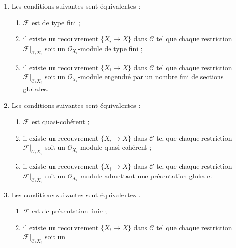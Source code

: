 \begin{lemma}
\begin{enumerate}
\begin{enumerate}
\item $\mathcal{F}$ est localement engendré par $r$ sections ;
\item il existe un recouvrement $\{X_i \to X\}$ dans $\mathcal{C}$ tel que
chaque restriction $\mathcal{F}|_{\mathcal{C}/X_i}$ soit un
$\mathcal{O}_{X_i}$-module localement engendré par $r$ sections ;
\item il existe un recouvrement $\{X_i \to X\}$ dans $\mathcal{C}$ tel que
chaque restriction $\mathcal{F}|_{\mathcal{C}/X_i}$ soit un
$\mathcal{O}_{X_i}$-module engendré par $r$ sections globales.
\end{enumerate}
\item Les conditions suivantes sont équivalentes :
\begin{enumerate}
\item $\mathcal{F}$ est de type fini ;
\item il existe un recouvrement $\{X_i \to X\}$ dans $\mathcal{C}$ tel que
chaque restriction $\mathcal{F}|_{\mathcal{C}/X_i}$ soit un
$\mathcal{O}_{X_i}$-module de type fini ;
\item il existe un recouvrement $\{X_i \to X\}$ dans $\mathcal{C}$ tel que
chaque restriction $\mathcal{F}|_{\mathcal{C}/X_i}$ soit un
$\mathcal{O}_{X_i}$-module engendré par un nombre fini de sections globales.
\end{enumerate}
\item Les conditions suivantes sont équivalentes :
\begin{enumerate}
\item $\mathcal{F}$ est quasi-cohérent ;
\item il existe un recouvrement $\{X_i \to X\}$ dans $\mathcal{C}$ tel que
chaque restriction $\mathcal{F}|_{\mathcal{C}/X_i}$ soit un
$\mathcal{O}_{X_i}$-module quasi-cohérent ;
\item il existe un recouvrement $\{X_i \to X\}$ dans $\mathcal{C}$ tel que
chaque restriction $\mathcal{F}|_{\mathcal{C}/X_i}$ soit un
$\mathcal{O}_{X_i}$-module admettant une présentation globale.
\end{enumerate}
\item Les conditions suivantes sont équivalentes :
\begin{enumerate}
\item $\mathcal{F}$ est de présentation finie ;
\item il existe un recouvrement $\{X_i \to X\}$ dans $\mathcal{C}$ tel que
chaque restriction $\mathcal{F}|_{\mathcal{C}/X_i}$ soit un

\end{enumerate}
\end{enumerate}
\end{lemma}
